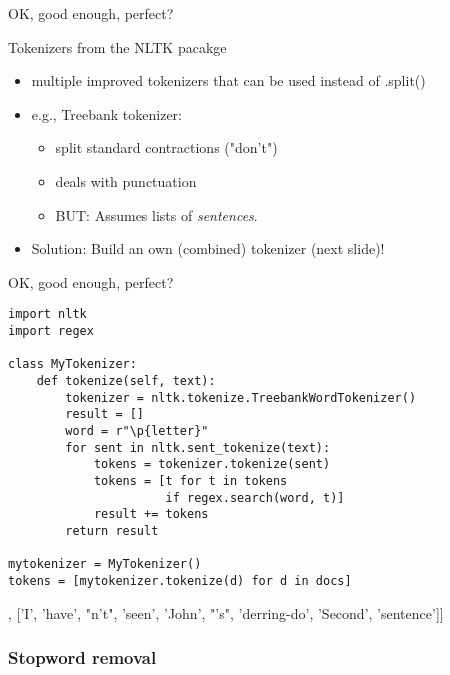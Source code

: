 \begin{frame}{OK, good enough, perfect?}
  \begin{block}{Tokenizers from the NLTK pacakge}
    \begin{itemize}
    \item multiple improved tokenizers that can be used instead of .split()
    \item e.g., Treebank tokenizer:
      \begin{itemize}
      \item split standard contractions ("don't")
      \item deals with punctuation
      \item BUT: Assumes lists of \emph{sentences}.
      \end{itemize}
    \item Solution: Build an own (combined) tokenizer (next slide)!
    \end{itemize}
  \end{block}
\end{frame}


\begin{frame}[fragile]{OK, good enough, perfect?}
\begin{verbatim}
import nltk
import regex

class MyTokenizer:
    def tokenize(self, text):
        tokenizer = nltk.tokenize.TreebankWordTokenizer()
        result = []
        word = r"\p{letter}"
        for sent in nltk.sent_tokenize(text):
            tokens = tokenizer.tokenize(sent)    
            tokens = [t for t in tokens 
                      if regex.search(word, t)]
            result += tokens
        return result
        
mytokenizer = MyTokenizer()
tokens = [mytokenizer.tokenize(d) for d in docs]

\end{verbatim}

\begin{lstlistingoutputtiny}
[['This', 'is', 'a', 'text'], ['I', 'have', "n't", 'seen', 'John', "'s", 'derring-do', 'Second', 'sentence']]
\end{lstlistingoutputtiny}
\end{frame}









\subsubsection{Stopword removal}



